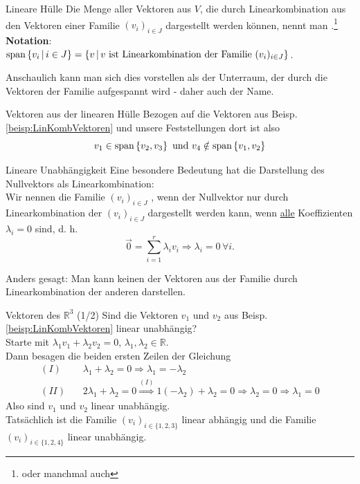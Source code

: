 \begin{Def}
{Lineare Hülle}
Die Menge aller Vektoren aus $V$, die durch Linearkombination aus den Vektoren einer Familie $(v_i)_{i\in J}$ dargestellt werden können, nennt man .\footnote{oder manchmal auch }\\
\textbf{Notation}:\\
$\text{span}\left\{v_i\,|\, i\in J\right\}=\{v\,|\, v\text{ ist Linearkombination der Familie } (v_i)_{i\in J}\}$.
\end{Def}
Anschaulich kann man sich dies vorstellen als der Unterraum, der durch die Vektoren der Familie aufgespannt wird - daher auch der Name.
\begin{Beispiel}{Vektoren aus der linearen Hülle}
Bezogen auf die Vektoren aus Beisp. \ref{beisp:LinKombVektoren} und unsere Feststellungen dort ist also
\begin{equation*}
    v_1\in\text{span}\left\{v_2,v_3\right\}\text{ und }v_4\notin\text{span}\left\{v_1,v_2\right\}
\end{equation*}
\end{Beispiel}
\begin{Def}
{Lineare Unabhängigkeit}
Eine besondere Bedeutung hat die Darstellung des Nullvektors als Linearkombination:\\
Wir nennen die Familie $(v_i)_{i\in J}$ , wenn der Nullvektor nur durch Linearkombination der $(v_i)_{i\in J}$ dargestellt werden kann, wenn \underline{alle} Koeffizienten $\lambda_i=0$ sind, d. h.
\begin{equation*}
    \Vec{0}=\sum_{i=1}^r\lambda_iv_i\Rightarrow \lambda_i=0\,\forall i.
\end{equation*}
\end{Def}
Anders gesagt: Man kann keinen der Vektoren aus der Familie durch Linearkombination der anderen darstellen.
\begin{Beispiel}
{Vektoren des $\mathbb{R}^3$ (1/2)}
Sind die Vektoren $v_1$ und $v_2$ aus Beisp. \ref{beisp:LinKombVektoren} linear unabhängig?\\
Starte mit $\lambda_1v_1+\lambda_2v_2=0$, $\lambda_1, \lambda_2\in\mathbb{R}$.\\
Dann besagen die beiden ersten Zeilen der Gleichung
\begin{eqnarray*}
    (I)&&\,\lambda_1+\lambda_2=0\Rightarrow\lambda_1=-\lambda_2\\
    (II)&&\,2\lambda_1+\lambda_2=0\overset{(I)}{\Rightarrow}1(-\lambda_2)+\lambda_2=0\Rightarrow\lambda_2=0\Rightarrow\lambda_1=0
\end{eqnarray*}
Also sind $v_1$ und $v_2$ linear unabhängig.\\
Tatsächlich ist die Familie $(v_i)_{i\in\{1,2,3\}}$ linear abhängig und die Familie $(v_i)_{i\in\{1,2,4\}}$ linear unabhängig.
\end{Beispiel}
